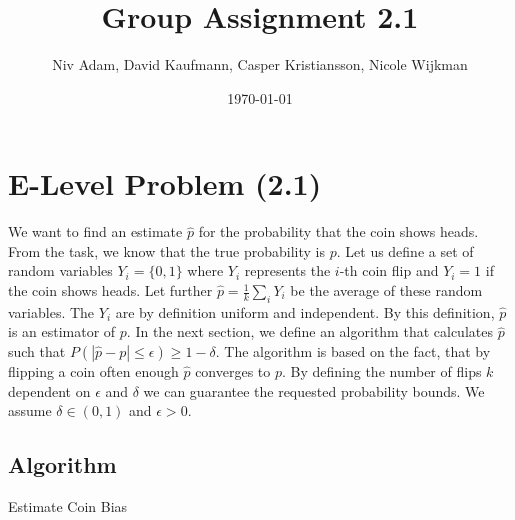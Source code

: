 \documentclass{article}
\title{Group Assignment 2.1}
\author{Niv Adam, David Kaufmann, Casper Kristiansson, Nicole Wijkman}
\date{\today}
\begin{document}
\maketitle

\section{E-Level Problem (2.1)}
We want to find an estimate $\hat{p}$ for the probability that the coin shows heads. From the task, we know that the true probability is $p$.
Let us define a set of random variables $Y_i=\{0,1\}$ where $Y_i$ represents the $i$-th coin flip and $Y_i = 1$ if the coin shows heads. Let further $\hat{p} = \frac{1}{k}\sum_i Y_i$ be the average of these random variables. The $Y_i$ are by definition uniform and independent. By this definition, $\hat{p}$ is an estimator of $p$.
In the next section, we define an algorithm that calculates $\hat{p}$ such that $P(|\hat{p}-p|\leq \epsilon)\geq 1-\delta$. The algorithm is based on the fact, that by flipping a coin often enough $\hat{p}$ converges to $p$. By defining the number of flips $k$ dependent on $\epsilon$ and $\delta$ we can guarantee the requested probability bounds. We assume $\delta\in(0,1)$ and $\epsilon > 0$.



\subsection{Algorithm}

\begin{algorithm}\label{alg:longestPath}
\caption{Estimate Coin Bias}
\DontPrintSemicolon


\end{algorithm}
\end{document}
